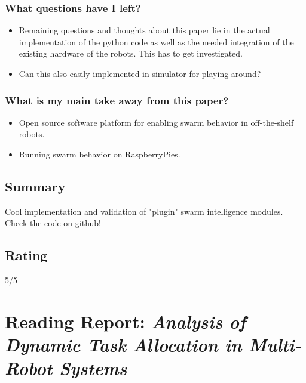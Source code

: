 \documentclass{article}
\begin{document}
\subsubsection*{What questions have I left?}
\begin{itemize}
    \item Remaining questions and thoughts about this paper lie in the actual implementation of the python code as well as the needed integration of the existing hardware of the robots. This has to get investigated.
    \item Can this also easily implemented in simulator for playing around?
\end{itemize}
\subsubsection*{What is my main take away from this paper?}
\begin{itemize}
    \item Open source software platform for enabling swarm behavior in off-the-shelf robots.
    \item Running swarm behavior on RaspberryPies.
\end{itemize}

\subsection*{Summary}
Cool implementation and validation of "plugin" swarm intelligence modules. Check the code on github!
\subsection*{Rating}
5/5



\section{Reading Report: \emph{Analysis of Dynamic Task Allocation in Multi-Robot Systems
}}
\cite{Lerman2006}
\end{document}
